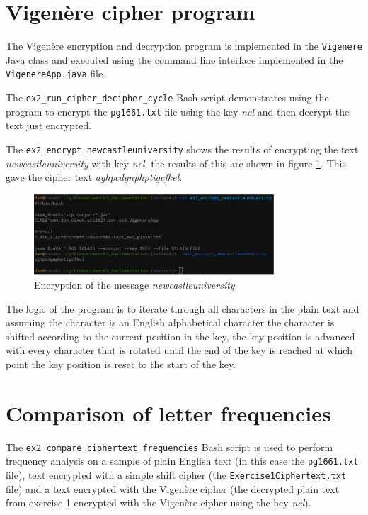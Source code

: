 \documentclass[a4paper]{article}
\title{\DOCTITLE}
\author{\DOCAUTHOR}
\date{\DOCDATE}
\newcommand{\Vigenere}{Vigen\`{e}re }
\begin{document}
\section{\Vigenere cipher program}
\label{sec:vigenere_program}

The \Vigenere encryption and decryption program is implemented in the
\texttt{Vigenere} Java class and executed using the command line interface
implemented in the \texttt{VigenereApp.java} file.

The \texttt{ex2\_run\_cipher\_decipher\_cycle} Bash script demonstrates using
the program to encrypt the \texttt{pg1661.txt} file using the key \textit{ncl}
and then decrypt the text just encrypted.

The \texttt{ex2\_encrypt\_newcastleuniversity} shows the results of encrypting
the text \textit{newcastleuniversity} with key \textit{ncl}, the results of this
are shown in figure \ref{fig:encrypt_newcastleuniversity_result}. This gave the
cipher text \textit{aghpcdgnphptigcfkel}.

\begin{figure}[h!]
  \centering
  \includegraphics[width=0.8\textwidth]{graphics/ex2_encrypt_newcastleuniversity_result.eps}
  \caption{Encryption of the message \textit{newcastleuniversity}}
  \label{fig:encrypt_newcastleuniversity_result}
\end{figure}

The logic of the program is to iterate through all characters in the plain text
and assuming the character is an English alphabetical character the character is
shifted according to the current position in the key, the key position is
advanced with every character that is rotated until the end of the key is
reached at which point the key position is reset to the start of the key.

\section{Comparison of letter frequencies}

The \texttt{ex2\_compare\_ciphertext\_frequencies} Bash script is used to
perform frequency analysis on a sample of plain English text (in this case the
\texttt{pg1661.txt} file), text encrypted with a simple shift cipher (the
\texttt{Exercise1Ciphertext.txt} file) and a text encrypted with the \Vigenere
cipher (the decrypted plain text from exercise 1 encrypted with the \Vigenere
cipher using the hey \textit{ncl}).
\end{document}
